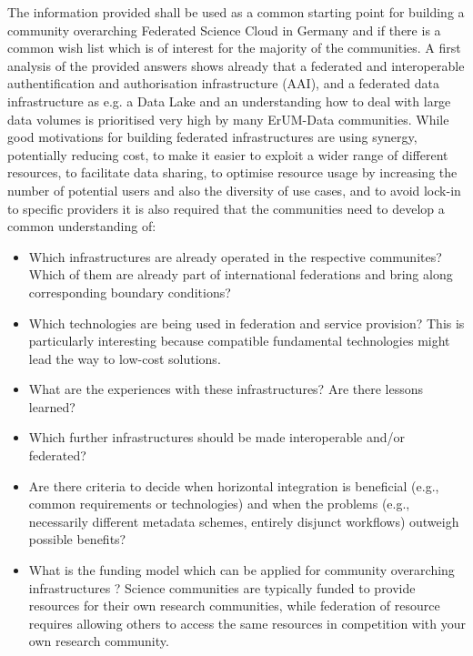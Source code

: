 \documentclass{article}
\begin{document}
The information provided shall be used as a common starting point for building
a community overarching Federated Science Cloud in Germany and
if there is a common wish list which is of interest for the majority of the communities.
A first analysis of the provided answers shows already that
a federated and interoperable authentification and authorisation infrastructure (AAI),
and a federated data infrastructure as e.g. a Data Lake and an understanding how to 
deal with large data volumes is prioritised very high by many ErUM-Data communities.
While good motivations for building federated infrastructures are
using synergy, potentially reducing cost, to make it easier to exploit a wider range of
different resources, to facilitate data sharing, to optimise resource usage
by increasing the number of potential users and also the diversity of use cases,
and to avoid lock-in to specific providers 
it is also required that the communities need to develop a common understanding of:


\begin{itemize}
\item Which infrastructures are already operated in the
respective communites?  Which of them are already part of international
federations and bring along corresponding boundary conditions?

\item Which technologies are being used in federation and service
provision?  This is particularly interesting because compatible
fundamental technologies might lead the way to low-cost solutions.

\item What are the experiences with these infrastructures?  Are there
lessons learned?

\item Which further infrastructures should be made interoperable and/or
federated?

\item Are there criteria to decide when horizontal integration is
beneficial (e.g., common requirements or technologies) and when the
problems (e.g., necessarily different metadata schemes, entirely
disjunct workflows) outweigh possible benefits?

\item What is the funding model which can be applied for community overarching infrastructures ?
Science communities are typically funded to provide resources for their
own research communities, while federation of resource requires allowing
others to access the same resources in competition with your own
research community. 
\end{itemize}
\end{document}
